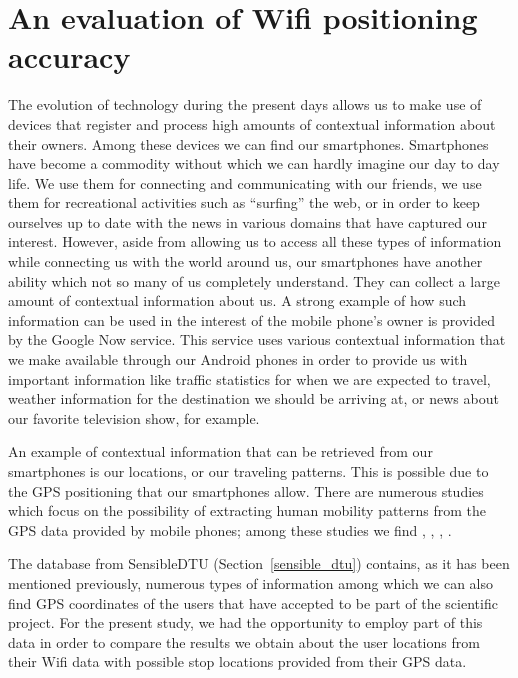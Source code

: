 \chapter{An evaluation of Wifi positioning accuracy} 

The evolution of technology during the present days allows us to make use of
devices that register and process high amounts of contextual information about
their owners. Among these devices we can find our smartphones. Smartphones have
become a commodity without which we can hardly imagine our day to day life. We
use them for connecting and communicating with our friends, we use them for
recreational activities such as ``surfing'' the web, or in order to keep
ourselves up to date with the news in various domains that have captured our
interest. However, aside from allowing us to access all these types of
information while connecting us with the world around us, our smartphones have
another ability which not so many of us completely understand. They can collect
a large amount of contextual information about us. A strong example of how such
information can be used in the interest of the mobile phone's owner is provided
by the Google Now \cite{GN} service. This service uses various contextual
information that we make available through our Android \cite{ANDR} phones in
order to provide us with important information like traffic statistics for when
we are expected to travel, weather information for the destination we should be
arriving at, or news about our favorite television show, for example.

An example of contextual information that can be retrieved from our smartphones
is our locations, or our traveling patterns. This is possible due to the GPS
positioning that our smartphones allow. There are numerous studies which focus
on the possibility of extracting human mobility patterns from the GPS data
provided by mobile phones; among these studies we find
\cite{Montoliu:2010:DHP:1899475.1899487},
\cite{cuttone2014inferring},
\cite{Zhou:2007:DPM:1247715.1247718}, \cite{Ashbrook:2003:UGL:945305.945310}.

The database from SensibleDTU (Section~\ref{sensible_dtu}) contains, as it has
been mentioned previously, numerous types of information among which we can also
find GPS coordinates of the users that have accepted to be part of the
scientific project. For the present study, we had the opportunity to employ part
of this data in order to compare the results we obtain about the user locations
from their Wifi data with possible stop locations provided from their GPS data.

